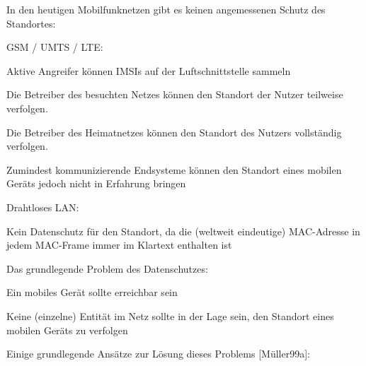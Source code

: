\documentclass[a4paper]{article}
\begin{document}
\begin{multicols}{3}
\begin{itemize*}
            \begin{itemize*}
                  \item
                  In den heutigen Mobilfunknetzen gibt es keinen angemessenen Schutz des
                  Standortes:

                  \begin{itemize*}
                        \item GSM / UMTS / LTE:
                        \begin{itemize*} \item Aktive Angreifer können IMSIs auf der Luftschnittstelle sammeln \item Die Betreiber des besuchten Netzes können den Standort der Nutzer teilweise verfolgen. \item Die Betreiber des Heimatnetzes können den Standort des Nutzers vollständig verfolgen. \item Zumindest kommunizierende Endsysteme können den Standort eines mobilen Geräts jedoch nicht in Erfahrung bringen \end{itemize*}
                  \end{itemize*}
                  \item
                  Drahtloses LAN:

                  \begin{itemize*}
                        \item Kein Datenschutz für den Standort, da die (weltweit eindeutige) MAC-Adresse in jedem MAC-Frame immer im Klartext enthalten ist
                  \end{itemize*}
                  \item
                  Das grundlegende Problem des Datenschutzes:

                  \begin{itemize*}
                        \item Ein mobiles Gerät sollte erreichbar sein
                        \item Keine (einzelne) Entität im Netz sollte in der Lage sein, den Standort eines mobilen Geräts zu verfolgen
                  \end{itemize*}
                  \item
                  Einige grundlegende Ansätze zur Lösung dieses Problems
                  {[}Müller99a{]}:


\end{itemize*}
\end{itemize*}
\end{multicols}
\end{document}
